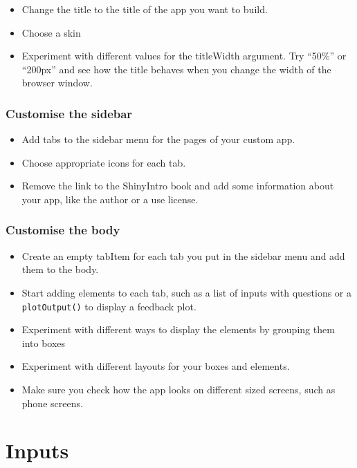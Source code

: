 \documentclass[
]{book}
\providecommand{\tightlist}{%
  \setlength{\itemsep}{0pt}\setlength{\parskip}{0pt}}
\begin{document}
\begin{itemize}
\tightlist
\item
  Change the title to the title of the app you want to build.
\item
  Choose a skin
\item
  Experiment with different values for the titleWidth argument. Try ``50\%'' or ``200px'' and see how the title behaves when you change the width of the browser window.
\end{itemize}

\hypertarget{customise-the-sidebar}{%
\subsection{Customise the sidebar}\label{customise-the-sidebar}}

\begin{itemize}
\tightlist
\item
  Add tabs to the sidebar menu for the pages of your custom app.
\item
  Choose appropriate icons for each tab.
\item
  Remove the link to the ShinyIntro book and add some information about your app, like the author or a use license.
\end{itemize}

\hypertarget{customise-the-body}{%
\subsection{Customise the body}\label{customise-the-body}}

\begin{itemize}
\tightlist
\item
  Create an empty tabItem for each tab you put in the sidebar menu and add them to the body.
\item
  Start adding elements to each tab, such as a list of inputs with questions or a \texttt{plotOutput()} to display a feedback plot.
\item
  Experiment with different ways to display the elements by grouping them into boxes
\item
  Experiment with different layouts for your boxes and elements.
\item
  Make sure you check how the app looks on different sized screens, such as phone screens.
\end{itemize}

\hypertarget{inputs}{%
\chapter{Inputs}\label{inputs}}
\end{document}
